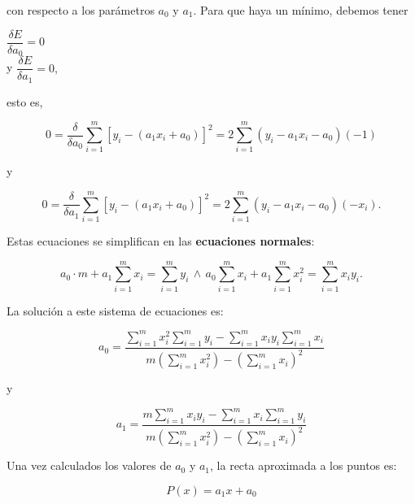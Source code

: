 con respecto a los parámetros $a_0$ y $a_1$. Para que haya un mínimo, debemos tener

\begin{center}
	$\displaystyle{\dfrac{\delta E}{\delta a_0}} = 0$\\ y $\displaystyle{\dfrac{\delta E}{\delta a_1}} = 0,$
\end{center}

esto es,

$$0 = \dfrac{\delta}{\delta a_0}\sum_{i=1}^{m} \left[ y_i - (a_1x_i + a_0) \right]^2 = 2\sum_{i=1}^{m} (y_i - a_1x_i - a_0)(-1)$$

y

$$0 = \dfrac{\delta}{\delta a_1}\sum_{i=1}^{m}\left[ y_i - (a_1x_i + a_0) \right]^2 = 2\sum_{i=1}^{m} (y_i - a_1x_i - a_0)(-x_i).$$

Estas ecuaciones se simplifican en las \textbf{ecuaciones normales}:

$$a_0\cdot m + a_1\sum_{i=1}^{m}x_i = \sum_{i=1}^{m}y_i
\,\wedge\,
a_0\sum_{i=1}^{m}x_i + a_{1}\sum_{i=1}^{m}x_i^2 = \sum_{i=1}^{m}x_iy_i.$$

La solución a este sistema de ecuaciones es:

\begin{equation}
	a_0 = \dfrac{\sum_{i=1}^{m}x_i^2 \sum_{i=1}^{m}y_i - \sum_{i=1}^{m}x_iy_i \sum_{i=1}^m x_i}{m \left(\displaystyle{\sum_{i=1}^{m}x_i^2}\right) - 
	\left(\displaystyle{\sum_{i=1}^m x_i}\right)^2}
	\label{eq:minimosCuadrados1}
\end{equation}

y

\begin{equation}
	a_1 = \dfrac{m\sum_{i=1}^{m}x_iy_i - \sum_{i=1}^{m}x_i \sum_{i=1}^m y_i}{m \left(\displaystyle{\sum_{i=1}^{m}x_i^2}\right) - 
	\left(\displaystyle{\sum_{i=1}^m x_i}\right)^2}
	\label{eq:minimosCuadrados2}
\end{equation}

Una vez calculados los valores de $a_0$ y $a_1$, la recta aproximada a los puntos es:

\begin{equation}
	P(x) = a_1x+a_0
	\label{eq:minimosCuadrados3}
\end{equation}

